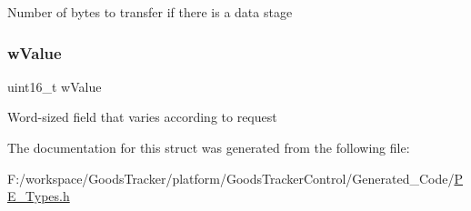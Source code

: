 Number of bytes to transfer if there is a data stage \mbox{\label{struct_l_d_d___u_s_b___t_s_d_p___struct_a7383d0165ad8eab48aa239c005199121}} 
\subsubsection{\texorpdfstring{w\+Value}{wValue}}
{\footnotesize\ttfamily uint16\+\_\+t w\+Value}

Word-\/sized field that varies according to request 

The documentation for this struct was generated from the following file\+:\begin{DoxyCompactItemize}
\item 
F\+:/workspace/\+Goods\+Tracker/platform/\+Goods\+Tracker\+Control/\+Generated\+\_\+\+Code/\hyperlink{_p_e___types_8h}{P\+E\+\_\+\+Types.\+h}\end{DoxyCompactItemize}
